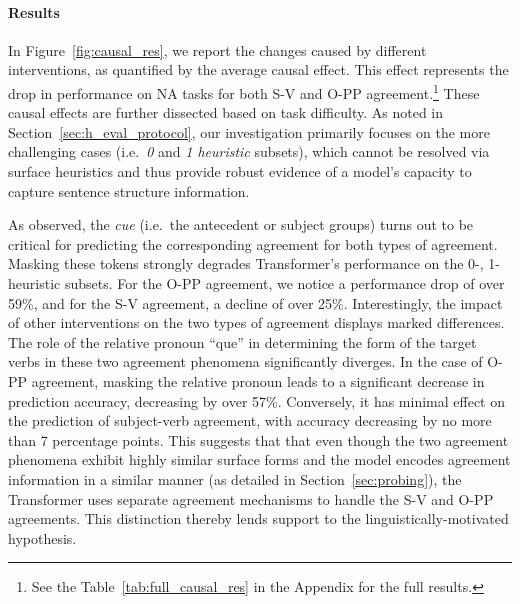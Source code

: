 \paragraph{Results} In Figure~\ref{fig:causal_res}, we report the changes caused by different interventions, as quantified by the average causal effect. This effect represents the drop in performance on NA tasks for both S-V and
O-PP agreement.\footnote{See the Table~\ref{tab:full_causal_res} in the Appendix for the full results.} These causal effects are further dissected based on task difficulty. As noted in Section~\ref{sec:h_eval_protocol}, our investigation primarily focuses on the more challenging cases (i.e.\ \emph{0}
and \emph{1 heuristic} subsets), which cannot be resolved via surface heuristics and thus provide robust evidence of a model's capacity to capture sentence structure information.


As observed, the
\emph{cue} (i.e.\ the antecedent or subject groups) turns out to be critical
for predicting the corresponding agreement for both types of agreement. Masking these tokens
strongly degrades Transformer's performance on the 0-, 1-heuristic subsets. For the O-PP agreement, we notice a performance drop of over 59\%, and for the S-V agreement, a decline of over 25\%. Interestingly, the impact of other interventions on the two types of agreement displays marked differences. The role of the relative pronoun ``que'' in determining the form of the target verbs in these two agreement phenomena significantly diverges. In the case of O-PP agreement, masking the relative pronoun leads to a significant decrease in prediction accuracy, decreasing by over 57\%. Conversely, it has minimal effect on the prediction of subject-verb agreement, with accuracy decreasing by no more than 7 percentage points. This suggests that that even though the two agreement phenomena exhibit highly similar surface forms and the model encodes agreement information in a similar manner (as detailed in Section~\ref{sec:probing}), the Transformer uses separate agreement mechanisms to handle the S-V and O-PP agreements. This distinction thereby lends support to the linguistically-motivated hypothesis.


